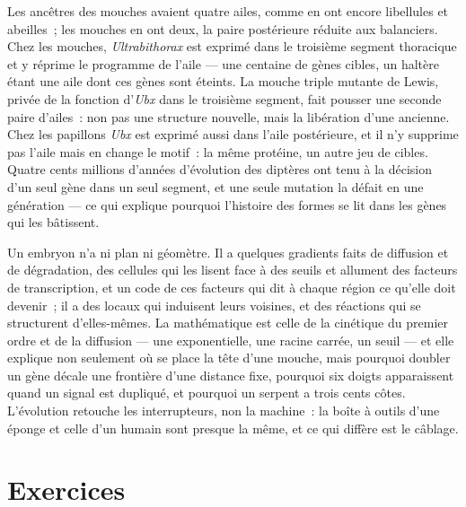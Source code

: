 \begin{example}\label{ex:b3:developmental-genetics:four-wings}
Les ancêtres des mouches avaient quatre ailes, comme en ont encore
libellules et abeilles~; les mouches en ont deux, la paire postérieure
réduite aux balanciers. Chez les mouches, \emph{Ultrabithorax} est
exprimé dans le troisième segment thoracique et y réprime le programme
de l'aile --- une centaine de gènes cibles, un haltère étant une aile
dont ces gènes sont éteints. La mouche triple mutante de Lewis, privée
de la fonction d'\emph{Ubx} dans le troisième segment, fait pousser une
seconde paire d'ailes~: non pas une structure nouvelle, mais la
libération d'une ancienne. Chez les papillons \emph{Ubx} est exprimé
aussi dans l'aile postérieure, et il n'y supprime pas l'aile mais en
change le motif~: la même protéine, un autre jeu de cibles. Quatre cents
millions d'années d'évolution des diptères ont tenu à la décision d'un
seul gène dans un seul segment, et une seule mutation la défait en une
génération --- ce qui explique pourquoi l'histoire des formes se lit
dans les gènes qui les bâtissent.
\end{example}

\begin{remark}\label{rem:b3:developmental-genetics:remark}
Un embryon n'a ni plan ni géomètre. Il a quelques gradients faits de
diffusion et de dégradation, des cellules qui les lisent face à des
seuils et allument des facteurs de transcription, et un code de ces
facteurs qui dit à chaque région ce qu'elle doit devenir~; il a des
 locaux qui induisent leurs voisines, et des réactions qui
se structurent d'elles-mêmes. La mathématique est celle de la cinétique
du premier ordre et de la diffusion --- une exponentielle, une racine
carrée, un seuil --- et elle explique non seulement où se place la tête
d'une mouche, mais pourquoi doubler un gène décale une frontière d'une
distance fixe, pourquoi six doigts apparaissent quand un signal est
dupliqué, et pourquoi un serpent a trois cents côtes. L'évolution
retouche les interrupteurs, non la machine~: la boîte à outils d'une
éponge et celle d'un humain sont presque la même, et ce qui diffère est
le câblage.
\end{remark}

\section{Exercices}

